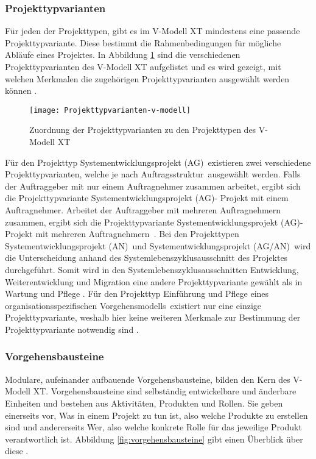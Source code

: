 \subsubsection{Projekttypvarianten}
Für jeden der Projekttypen, gibt es im V-Modell XT mindestens eine passende Projekttypvariante. Diese bestimmt die Rahmenbedingungen für mögliche Abläufe eines Projektes. In Abbildung \ref{fig:Projekttypvarianten} sind die verschiedenen Projekttypvarianten des V-Modell XT aufgelistet und es wird gezeigt, mit welchen Merkmalen die zugehörigen Projekttypvarianten ausgewählt werden können \cite{2004vmodell}.   
\begin{figure}[htp]
\begin{center}
  \texttt{[image: Projekttypvarianten-v-modell]} %
  \caption{Zuordnung der Projekttypvarianten zu den Projekttypen des V-Modell XT \cite{2004vmodell}}
  \label{fig:Projekttypvarianten}
\end{center}
\end{figure}

Für den Projekttyp \grqq Systementwicklungsprojekt (AG)\grqq \ existieren zwei verschiedene Projekttypvarianten, welche je nach \grqq Auftragsstruktur\grqq \ ausgewählt werden. Falls der Auftraggeber mit nur einem Auftragnehmer zusammen arbeitet, ergibt sich die Projekttypvariante \grqq Systementwicklungsprojekt (AG)- Projekt mit einem Auftragnehmer\grqq. Arbeitet der Auftraggeber mit mehreren Auftragnehmern zusammen, ergibt sich die Projekttypvariante \grqq Systementwicklungsprojekt (AG)- Projekt mit mehreren Auftragnehmern\grqq \ \cite{2004vmodell}.\newline
Bei den Projekttypen \grqq Systementwicklungsprojekt (AN)\grqq \ und \grqq Systementwicklungsprojekt (AG/AN)\grqq \ wird die Unterscheidung anhand des Systemlebenszyklusausschnitt des Projektes durchgeführt. Somit wird in den Systemlebenszyklusausschnitten Entwicklung, Weiterentwicklung und Migration eine andere Projekttypvariante gewählt als in Wartung und Pflege \cite{2004vmodell}.\newline 
Für den Projekttyp \grqq Einführung und Pflege eines organisationsspezifischen Vorgehensmodells\grqq \ existiert nur eine einzige Projekttypvariante, weshalb hier keine weiteren Merkmale zur Bestimmung der Projekttypvariante notwendig sind \cite{2004vmodell}.\newline

  
 \subsubsection{Vorgehensbausteine}
Modulare, aufeinander aufbauende Vorgehensbausteine, bilden den Kern des V-Modell XT. Vorgehensbausteine sind selbständig entwickelbare und änderbare Einheiten und bestehen aus Aktivitäten, Produkten und Rollen. Sie geben einerseits vor, \grqq Was\grqq{}  in einem Projekt zu tun ist, also welche Produkte zu erstellen sind und andererseits \grqq Wer\grqq, also welche konkrete Rolle für das jeweilige Produkt verantwortlich ist. Abbildung \ref{fig:vorgehensbausteine} gibt einen Überblick über diese \cite{ruf2008, 2004vmodell}.\newline

